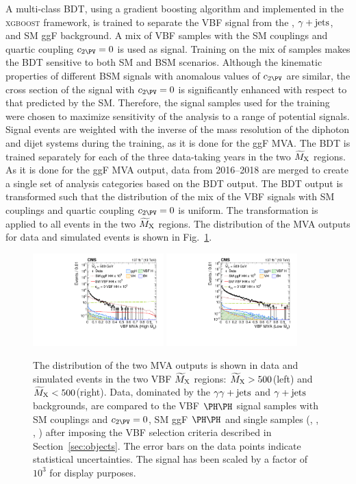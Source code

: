 \documentclass[11pt,twoside,a4paper,cmspaper,final,collab]{cms-tdr}
\begin{document}
A multi-class BDT, using a gradient boosting algorithm and implemented in the \textsc{xgboost} \cite{xgboost} framework, is trained to separate the VBF \HH signal from the \DIPHO, $\gamma+\text{jets}$, and SM ggF \HH background. A mix of VBF \HH samples with the SM couplings and quartic coupling $\ctwov=0$ is used as signal.
Training on the mix of samples makes the BDT sensitive to both SM and BSM scenarios.
Although the kinematic properties of different BSM signals with anomalous values of $\ctwov$ are similar, the cross section of the signal with $\ctwov=0$ is significantly enhanced with respect to that predicted by the SM. Therefore, the signal samples used for the training were chosen to maximize sensitivity of the analysis to a range of potential signals. Signal events are weighted with the inverse of the mass resolution of the diphoton and dijet systems during the training, as it is done for the ggF MVA.
The BDT is trained separately for each of the three data-taking years in the two $\widetilde{M}_{\mathrm{X}}$ regions. As it is done for the ggF MVA output, data from 2016--2018 are merged to create a single set of analysis categories based on the BDT output. The BDT output is transformed such that the distribution of the mix of the VBF \HH signals with SM couplings and quartic coupling $\ctwov=0$ is uniform. The transformation is applied to all events in the two $\widetilde{M}_{\mathrm{X}}$ regions. The distribution of the MVA outputs for data and simulated events is shown in Fig.~\ref{fig:cumulativeVBF}.
\begin{figure}[thb]
  \centering
  \includegraphics[width=0.45\textwidth]{Figure_006-a.pdf}\hfil 
  \includegraphics[width=0.45\textwidth]{Figure_006-b.pdf}\hfil 
  \caption{The distribution of the two MVA outputs is shown in data and simulated events in the two VBF $\widetilde{M}_{\mathrm{X}}$ regions: $\widetilde{M}_{\mathrm{X}}>500$\GeV (left) and $\widetilde{M}_{\mathrm{X}}<500$\GeV (right). Data, dominated by the $\gamma\gamma+\text{jets}$ and $\gamma+\text{jets}$ backgrounds, are compared to the VBF $\HH$ signal samples with SM couplings and $\ctwov=0$, SM ggF $\HH$ and single \PH samples (\ttH, \ggH, \VBFH, \VH) after imposing the VBF selection criteria described in Section~\ref{sec:objects}. The error bars on the data points indicate statistical uncertainties. The \HH signal has been scaled by a factor of $10^{3}$ for display purposes. }
  \label{fig:cumulativeVBF}
\end{figure}
\end{document}
